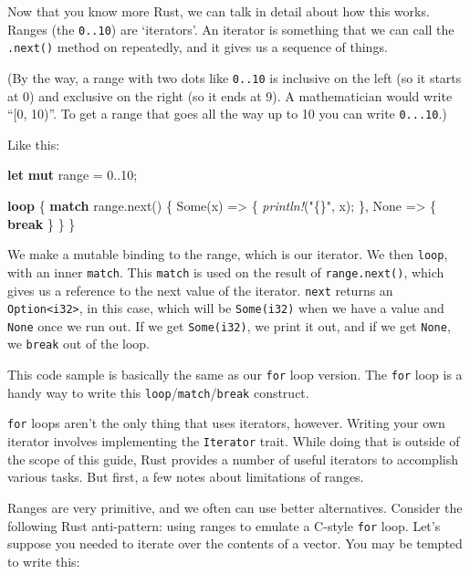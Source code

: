 \documentclass[a4paper,]{book}
\newenvironment{Shaded}{\begin{snugshade}}{\end{snugshade}}
\newcommand{\KeywordTok}[1]{\textcolor[rgb]{0.13,0.29,0.53}{\textbf{{#1}}}}
\newcommand{\DecValTok}[1]{\textcolor[rgb]{0.00,0.00,0.81}{{#1}}}
\newcommand{\ConstantTok}[1]{\textcolor[rgb]{0.00,0.00,0.00}{{#1}}}
\newcommand{\StringTok}[1]{\textcolor[rgb]{0.31,0.60,0.02}{{#1}}}
\newcommand{\PreprocessorTok}[1]{\textcolor[rgb]{0.56,0.35,0.01}{\textit{{#1}}}}
\newcommand{\NormalTok}[1]{{#1}}
\begin{document}
Now that you know more Rust, we can talk in detail about how this works.
Ranges (the \texttt{0..10}) are `iterators'. An iterator is something
that we can call the \texttt{.next()} method on repeatedly, and it gives
us a sequence of things.

(By the way, a range with two dots like \texttt{0..10} is inclusive on
the left (so it starts at 0) and exclusive on the right (so it ends at
9). A mathematician would write ``{[}0, 10)''. To get a range that goes
all the way up to 10 you can write \texttt{0...10}.)

Like this:

\begin{Shaded}
\begin{Highlighting}[]
\KeywordTok{let} \KeywordTok{mut} \NormalTok{range = }\DecValTok{0.}\NormalTok{.}\DecValTok{10}\NormalTok{;}

\KeywordTok{loop} \NormalTok{\{}
    \KeywordTok{match} \NormalTok{range.next() \{}
        \ConstantTok{Some}\NormalTok{(x) => \{}
            \PreprocessorTok{println!}\NormalTok{(}\StringTok{"\{\}"}\NormalTok{, x);}
        \NormalTok{\},}
        \ConstantTok{None} \NormalTok{=> \{ }\KeywordTok{break} \NormalTok{\}}
    \NormalTok{\}}
\NormalTok{\}}
\end{Highlighting}
\end{Shaded}

We make a mutable binding to the range, which is our iterator. We then
\texttt{loop}, with an inner \texttt{match}. This \texttt{match} is used
on the result of \texttt{range.next()}, which gives us a reference to
the next value of the iterator. \texttt{next} returns an
\texttt{Option\textless{}i32\textgreater{}}, in this case, which will be
\texttt{Some(i32)} when we have a value and \texttt{None} once we run
out. If we get \texttt{Some(i32)}, we print it out, and if we get
\texttt{None}, we \texttt{break} out of the loop.

This code sample is basically the same as our \texttt{for} loop version.
The \texttt{for} loop is a handy way to write this
\texttt{loop}/\texttt{match}/\texttt{break} construct.

\texttt{for} loops aren't the only thing that uses iterators, however.
Writing your own iterator involves implementing the \texttt{Iterator}
trait. While doing that is outside of the scope of this guide, Rust
provides a number of useful iterators to accomplish various tasks. But
first, a few notes about limitations of ranges.

Ranges are very primitive, and we often can use better alternatives.
Consider the following Rust anti-pattern: using ranges to emulate a
C-style \texttt{for} loop. Let's suppose you needed to iterate over the
contents of a vector. You may be tempted to write this:
\end{document}
